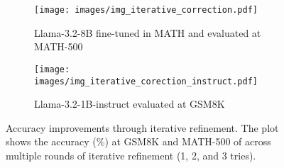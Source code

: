 \begin{figure}[t]
\begin{minipage}{\columnwidth}

    \centering
    \begin{subfigure}[t]{.495\textwidth}
    \texttt{[image: images/img\_iterative\_correction.pdf]} 
    \caption{Llama-3.2-8B fine-tuned in MATH and evaluated at MATH-500}
    \end{subfigure}
    \begin{subfigure}[t]{.495\textwidth}
    \texttt{[image: images/img\_iterative\_corection\_instruct.pdf]} 
    \caption{Llama-3.2-1B-instruct evaluated at GSM8K}
    \end{subfigure}
    \caption{Accuracy improvements through iterative refinement. The plot shows the accuracy (\%) at GSM8K and MATH-500 of \sname across multiple rounds of iterative refinement (1, 2, and 3 tries). }
    \label{figure:iterative_refinement}

\end{minipage}
\end{figure}